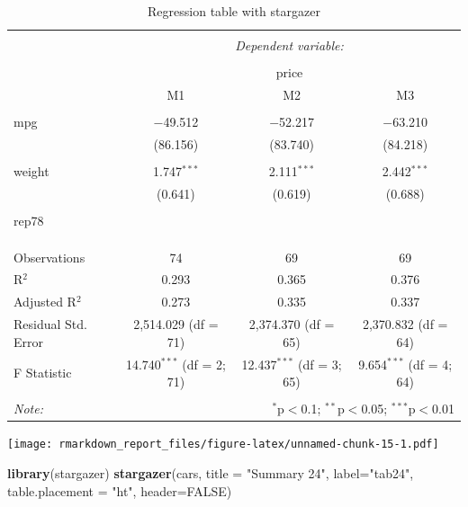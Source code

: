 \documentclass[
  12pt,
]{article}
\newenvironment{Shaded}{\begin{snugshade}}{\end{snugshade}}
\newcommand{\DataTypeTok}[1]{\textcolor[rgb]{0.13,0.29,0.53}{#1}}
\newcommand{\KeywordTok}[1]{\textcolor[rgb]{0.13,0.29,0.53}{\textbf{#1}}}
\newcommand{\NormalTok}[1]{#1}
\newcommand{\OtherTok}[1]{\textcolor[rgb]{0.56,0.35,0.01}{#1}}
\newcommand{\StringTok}[1]{\textcolor[rgb]{0.31,0.60,0.02}{#1}}
\begin{document}
\begin{table}[ht] \centering 
  \caption{Regression table with stargazer} 
  \label{tab3} 
\begin{tabular}{@{\extracolsep{5pt}}lccc} 
\\[-1.8ex]\hline 
\hline \\[-1.8ex] 
 & \multicolumn{3}{c}{\textit{Dependent variable:}} \\ 
\cline{2-4} 
\\[-1.8ex] & \multicolumn{3}{c}{price} \\ 
 & M1 & M2 & M3 \\ 
\hline \\[-1.8ex] 
 mpg & $-$49.512 & $-$52.217 & $-$63.210 \\ 
  & (86.156) & (83.740) & (84.218) \\ 
  & & & \\ 
 weight & 1.747$^{***}$ & 2.111$^{***}$ & 2.442$^{***}$ \\ 
  & (0.641) & (0.619) & (0.688) \\ 
  & & & \\ 
 rep78 &  &  &  \\ 
  &  &  &  \\ 
  & & & \\ 
\hline \\[-1.8ex] 
Observations & 74 & 69 & 69 \\ 
R$^{2}$ & 0.293 & 0.365 & 0.376 \\ 
Adjusted R$^{2}$ & 0.273 & 0.335 & 0.337 \\ 
Residual Std. Error & 2,514.029 (df = 71) & 2,374.370 (df = 65) & 2,370.832 (df = 64) \\ 
F Statistic & 14.740$^{***}$ (df = 2; 71) & 12.437$^{***}$ (df = 3; 65) & 9.654$^{***}$ (df = 4; 64) \\ 
\hline 
\hline \\[-1.8ex] 
\textit{Note:}  & \multicolumn{3}{r}{$^{*}$p$<$0.1; $^{**}$p$<$0.05; $^{***}$p$<$0.01} \\ 
\end{tabular} 
\end{table}

\texttt{[image: rmarkdown\_report\_files/figure-latex/unnamed-chunk-15-1.pdf]}

\begin{Shaded}
\begin{Highlighting}[]
\KeywordTok{library}\NormalTok{(stargazer)}
\KeywordTok{stargazer}\NormalTok{(cars,}
          \DataTypeTok{title =} \StringTok{"Summary 24"}\NormalTok{,}
          \DataTypeTok{label=}\StringTok{"tab24"}\NormalTok{,}
          \DataTypeTok{table.placement =} \StringTok{"ht"}\NormalTok{,}
          \DataTypeTok{header=}\OtherTok{FALSE}\NormalTok{)}
\end{Highlighting}
\end{Shaded}
\end{document}
